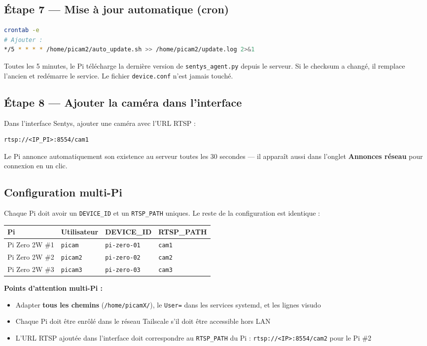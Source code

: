 \documentclass[12pt,a4paper]{article}
\begin{document}
\subsection{Étape 7 — Mise à jour automatique (cron)}

\begin{lstlisting}[language=bash]
crontab -e
# Ajouter :
*/5 * * * * /home/picam2/auto_update.sh >> /home/picam2/update.log 2>&1
\end{lstlisting}

Toutes les 5 minutes, le Pi télécharge la dernière version de \texttt{sentys\_agent.py}
depuis le serveur. Si le checksum a changé, il remplace l'ancien et redémarre le service.
Le fichier \texttt{device.conf} n'est jamais touché.

\subsection{Étape 8 — Ajouter la caméra dans l'interface}

Dans l'interface Sentys, ajouter une caméra avec l'URL RTSP :
\begin{lstlisting}
rtsp://<IP_PI>:8554/cam1
\end{lstlisting}

Le Pi annonce automatiquement son existence au serveur toutes les 30 secondes —
il apparaît aussi dans l'onglet \textbf{Annonces réseau} pour connexion en un clic.

\subsection{Configuration multi-Pi}

Chaque Pi doit avoir un \texttt{DEVICE\_ID} et un \texttt{RTSP\_PATH} uniques.
Le reste de la configuration est identique :

\begin{longtable}{|l|l|l|l|}
\hline
\textbf{Pi} & \textbf{Utilisateur} & \textbf{DEVICE\_ID} & \textbf{RTSP\_PATH} \\
\hline
\endhead
\hline
\endfoot
Pi Zero 2W \#1 & \texttt{picam} & \texttt{pi-zero-01} & \texttt{cam1} \\
Pi Zero 2W \#2 & \texttt{picam2} & \texttt{pi-zero-02} & \texttt{cam2} \\
Pi Zero 2W \#3 & \texttt{picam3} & \texttt{pi-zero-03} & \texttt{cam3} \\
\hline
\end{longtable}

\textbf{Points d'attention multi-Pi :}
\begin{itemize}
  \item Adapter \textbf{tous les chemins} (\texttt{/home/picamX/}), le \texttt{User=} dans
    les services systemd, et les lignes visudo
  \item Chaque Pi doit être enrôlé dans le réseau Tailscale s'il doit être accessible hors LAN
  \item L'URL RTSP ajoutée dans l'interface doit correspondre au \texttt{RTSP\_PATH} du Pi :
    \texttt{rtsp://<IP>:8554/cam2} pour le Pi \#2
\end{itemize}
\end{document}
